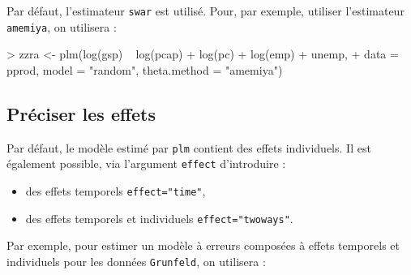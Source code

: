 \documentclass[a4paper]{article}
\begin{document}
Par défaut, l'estimateur \texttt{swar} est utilisé. Pour, par exemple,
utiliser l'estimateur \texttt{amemiya}, on utilisera :

\begin{Schunk}
\begin{Sinput}
> zzra <- plm(log(gsp) ~ log(pcap) + log(pc) + log(emp) + unemp, 
+     data = pprod, model = "random", theta.method = "amemiya")
\end{Sinput}
\end{Schunk}


\subsection{Préciser les effets}

Par défaut, le modèle estimé par \texttt{plm} contient des effets
individuels. Il est également possible, via l'argument \texttt{effect}
d'introduire :


\begin{itemize}
\item des effets temporels \texttt{effect="time"},
\item des effets temporels et individuels \texttt{effect="twoways"}.
\end{itemize}

Par exemple, pour estimer un modèle à erreurs composées à effets
temporels et individuels pour les données \texttt{Grunfeld}, on
utilisera :
\end{document}
